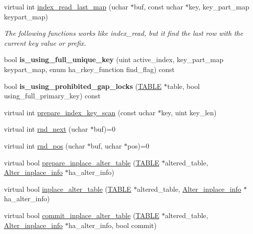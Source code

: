\begin{DoxyCompactItemize}
virtual int \mbox{\hyperlink{classhandler_ae069d5991214e1fdf14cc44fd865a180}{index\+\_\+read\+\_\+last\+\_\+map}} (uchar $\ast$buf, const uchar $\ast$key, key\+\_\+part\+\_\+map keypart\+\_\+map)
\begin{DoxyCompactList}\small\item\em The following functions works like index\+\_\+read, but it find the last row with the current key value or prefix. \end{DoxyCompactList}\item 
\mbox{\label{classhandler_a76b748cb37f18c1db0a6dfc016a32b86}} 
bool {\bfseries is\+\_\+using\+\_\+full\+\_\+unique\+\_\+key} (uint active\+\_\+index, key\+\_\+part\+\_\+map keypart\+\_\+map, enum ha\+\_\+rkey\+\_\+function find\+\_\+flag) const
\item 
\mbox{\label{classhandler_a5fe486748715adbe6f7d6b9a9228cdf4}} 
bool {\bfseries is\+\_\+using\+\_\+prohibited\+\_\+gap\+\_\+locks} (\mbox{\hyperlink{structTABLE}{T\+A\+B\+LE}} $\ast$table, bool using\+\_\+full\+\_\+primary\+\_\+key) const
\item 
virtual int \mbox{\hyperlink{classhandler_a03831da80c8a99422edd4b4ab84fa55a}{prepare\+\_\+index\+\_\+key\+\_\+scan}} (const uchar $\ast$key, uint key\+\_\+len)
\item 
virtual int \mbox{\hyperlink{classhandler_a48cb9c94ca93dbfbb7e92822caba82a1}{rnd\+\_\+next}} (uchar $\ast$buf)=0
\item 
virtual int \mbox{\hyperlink{classhandler_adf659edd9d870e90c8974ae0eba7a082}{rnd\+\_\+pos}} (uchar $\ast$buf, uchar $\ast$pos)=0
\item 
virtual bool \mbox{\hyperlink{classhandler_ab25b3931a457f1821ba55ae9cce79d98}{prepare\+\_\+inplace\+\_\+alter\+\_\+table}} (\mbox{\hyperlink{structTABLE}{T\+A\+B\+LE}} $\ast$altered\+\_\+table, \mbox{\hyperlink{classAlter__inplace__info}{Alter\+\_\+inplace\+\_\+info}} $\ast$ha\+\_\+alter\+\_\+info)
\item 
virtual bool \mbox{\hyperlink{classhandler_a90b4c3a8fe1c89c6ccfec1f4b144754a}{inplace\+\_\+alter\+\_\+table}} (\mbox{\hyperlink{structTABLE}{T\+A\+B\+LE}} $\ast$altered\+\_\+table, \mbox{\hyperlink{classAlter__inplace__info}{Alter\+\_\+inplace\+\_\+info}} $\ast$ha\+\_\+alter\+\_\+info)
\item 
virtual bool \mbox{\hyperlink{classhandler_a0786a5f57ccd3c97bff07b1afeae9c06}{commit\+\_\+inplace\+\_\+alter\+\_\+table}} (\mbox{\hyperlink{structTABLE}{T\+A\+B\+LE}} $\ast$altered\+\_\+table, \mbox{\hyperlink{classAlter__inplace__info}{Alter\+\_\+inplace\+\_\+info}} $\ast$ha\+\_\+alter\+\_\+info, bool commit)

\end{DoxyCompactItemize}
